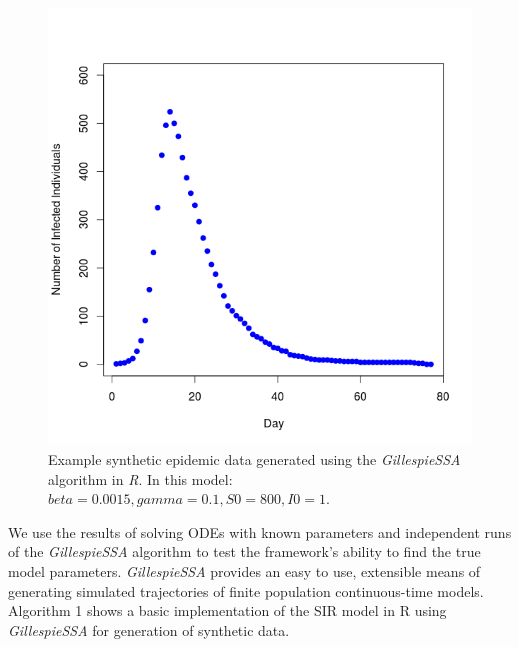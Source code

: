 \begin{center}
\begin{figure}[ht!]

\includegraphics[width=15cm]{simplesir.png}
\caption{Example synthetic epidemic data generated using the
  \emph{GillespieSSA} algorithm in \emph{R}. In this model: $beta =
  0.0015, gamma = 0.1, S0 = 800, I0 = 1$.}
\label{figure:examples}
\end{figure}  
\end{center}

We use the results of solving ODEs with known parameters and
independent runs of the \emph{GillespieSSA} algorithm to test the
framework's ability to find the true model
parameters. \emph{GillespieSSA} provides an easy to use, extensible
means of generating simulated trajectories of finite population
continuous-time models. Algorithm 1 shows a basic implementation of the
SIR model in R using \emph{GillespieSSA} for generation of synthetic data.

